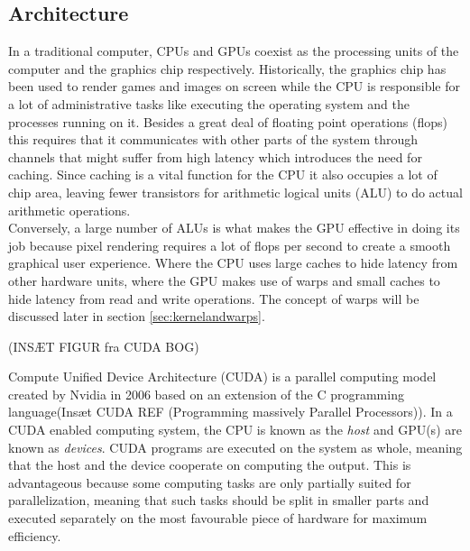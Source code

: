 
\subsection{Architecture}
In a traditional computer, CPUs and GPUs coexist as the processing units of the computer and the graphics chip respectively. Historically, the graphics chip has been used to render games and images on screen while the CPU is responsible for a lot of administrative tasks like executing the operating system and the processes running on it. Besides a great deal of floating point operations (flops) this requires that it communicates with other parts of the system through channels that might suffer from high latency which introduces the need for caching. Since caching is a vital function for the CPU it also occupies a lot of chip area, leaving fewer transistors for arithmetic logical units (ALU) to do actual arithmetic operations. \\

Conversely, a large number of ALUs is what makes the GPU effective in doing its job because pixel rendering requires a lot of flops per second to create a smooth graphical user experience. Where the CPU uses large caches to hide latency from other hardware units, where the GPU makes use of warps and small caches to hide latency from read and write operations. The concept of warps will be discussed later in section \ref{sec:kernelandwarps}.

(INSÆT FIGUR fra CUDA BOG)

Compute Unified Device Architecture (CUDA) is a parallel computing model created by Nvidia in 2006 based on an extension of the C programming language(Insæt CUDA REF (Programming massively Parallel Processors)). In a CUDA enabled computing system, the CPU is known as the \emph{host} and GPU(s) are known as \emph{devices}. CUDA programs are executed on the system as whole, meaning that the host and the device cooperate on computing the output. This is advantageous because some computing tasks are only partially suited for parallelization, meaning that such tasks should be split in smaller parts and executed separately on the most favourable piece of hardware for maximum efficiency.\\

